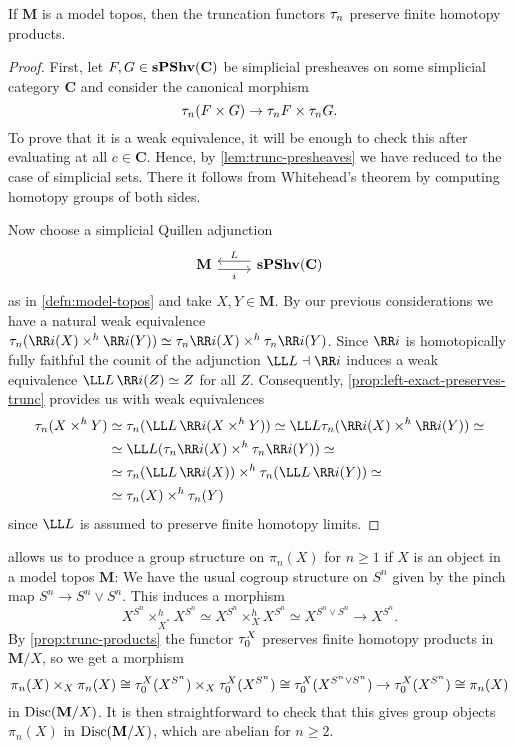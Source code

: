 \begin{proposition}\label{prop:trunc-products}
  If \(\mathbf M\) is a model topos, then the truncation functors \(\tau_{n}\) preserve finite homotopy products.
\end{proposition}
\begin{proof}
  First, let \(F,G\in\operatorname{\textnormal{\bfseries sPShv}}(\mathbf C)\) be simplicial presheaves on some simplicial category \(\mathbf C\) and consider the canonical morphism
  \[\tau_{n}(F\times G)\to \tau_{n}F\times\tau_{n}G.\]
  To prove that it is a weak equivalence, it will be enough to check this after evaluating at all \(c\in\mathbf C\). Hence, by \autoref{lem:trunc-presheaves} we have reduced to the case of simplicial sets. There it follows from Whitehead's theorem by computing homotopy groups of both sides.

  Now choose a simplicial Quillen adjunction
  \[
  \begin{tikzcd}
    \mathbf M \arrow[r, shift right=.7ex, "i"'] & \arrow[l, shift right=.7ex, "L"'] \spshv(\mathbf C)
  \end{tikzcd}
  \]
  as in \autoref{defn:model-topos} and take \(X, Y\in\mathbf M\). By our previous considerations we have a natural weak equivalence \(\trunc{n}(\RR i(X)\times^{h}\RR i(Y))\simeq \trunc{n}\RR i(X)\times^{h}\trunc{n}\RR i(Y)\). Since \(\RR i\) is homotopically fully faithful the counit of the adjunction \(\LL L\dashv \RR i\) induces a weak equivalence \(\LL L\,\RR i (Z)\simeq Z\) for all \(Z\). Consequently, \autoref{prop:left-exact-preserves-trunc} provides us with weak equivalences
  \begin{align*}
    \trunc{n}(X\times^{h} Y) &\simeq \trunc{n}(\LL L\,\RR i(X\times^{h} Y)) \simeq \LL L\trunc{n}(\RR i(X)\times^{h} \RR i(Y)) \simeq \\
                         &\simeq \LL L(\trunc{n}\RR i(X)\times^{h} \trunc{n}\RR i(Y)) \simeq \\
                         &\simeq \trunc{n}(\LL L\,\RR i(X)) \times^{h} \trunc{n}(\LL L\,\RR i(Y)) \simeq \\
                         &\simeq \trunc{n}(X) \times^{h} \trunc{n}(Y)
  \end{align*}
  since \(\LL L\) is assumed to preserve finite homotopy limits.
\end{proof}

 allows us to produce a group structure on \(\pi_{n}(X)\) for \(n\geq 1\) if \(X\) is an object in a model topos \(\mathbf M\): We have the usual cogroup structure on \(S^{n}\) given by the pinch map \(S^{n}\to S^{n}\vee S^{n}\). This induces a morphism
\[X^{S^{n}}\times^{h}_{X^{*}} X^{S^{n}} \simeq X^{S^{n}}\times^{h}_{X} X^{S^{n}} \simeq  X^{S^{n}\vee S^{n}} \to X^{S^{n}}.\]
By \autoref{prop:trunc-products} the functor \(\tau_{0}^{X}\) preserves finite homotopy products in \(\mathbf M/X\), so we get a morphism
\[\pi_{n}(X)\times_{X}\pi_{n}(X)\cong \tau_{0}^{X}(X^{S^{n}})\times_{X}\tau_{0}^{X}(X^{S^{n}})\cong \tau_{0}^{X}(X^{S^{n}\vee S^{n}}) \to \tau_{0}^{X}(X^{S^{n}}) \cong \pi_{n}(X)\]
in \(\operatorname{\textnormal{Disc}}(\mathbf M/X)\). It is then straightforward to check that this gives group objects \(\pi_{n}(X)\) in \(\operatorname{\textnormal{Disc}}(\mathbf M/X)\), which are abelian for \(n\geq 2\).

